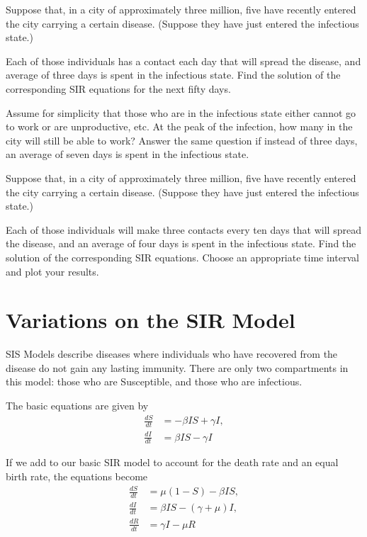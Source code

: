 \begin{problem}
Suppose that, in a city of approximately three million, five have recently entered the city carrying a certain disease.
(Suppose they have just entered the infectious state.)

Each of those individuals has a contact each day that will spread the disease, and average of three days is spent in the infectious state.
Find the solution of the corresponding SIR equations for the next fifty days.

Assume for simplicity that those who are in the infectious state either cannot go to work or are unproductive, etc.
At the peak of the infection, how many in the city will still be able to work?
Answer the same question if instead of three days, an average of seven days is spent in the infectious state.
\end{problem}


\begin{problem}
Suppose that, in a city of approximately three million, five have recently entered the city carrying a certain disease.
(Suppose they have just entered the infectious state.)

Each of those individuals will make three contacts every ten days that will spread the disease, and an average of four days is spent in the infectious state.
Find the solution of the corresponding SIR equations.
Choose an appropriate time interval and plot your results.
\end{problem}

\section*{Variations on the SIR Model}

SIS Models describe diseases where individuals who have recovered from the disease do not gain
any lasting immunity.
There are only two compartments in this model: those who are Susceptible, and those who are infectious.

The basic equations are given by
\begin{align*}
\frac{dS}{dt} &=-\beta I S + \gamma I ,\\
\frac{dI}{dt} &= \beta I S-\gamma I
\end{align*}

If we add to our basic SIR model to account for the death rate and an equal birth rate, the equations become
\begin{align*}
\frac{dS}{dt} &=\mu(1 -S) - \beta I S,\\
\frac{dI}{dt} &= \beta I S - (\gamma + \mu)I, \\
\frac{dR}{dt} &= \gamma I - \mu R
\end{align*}

